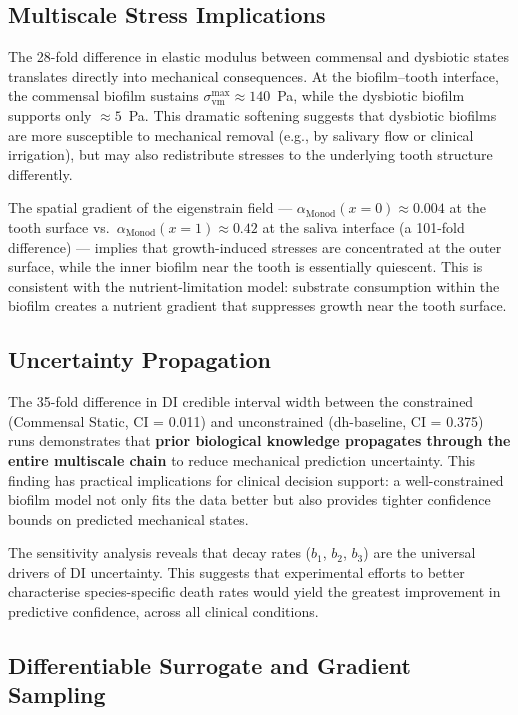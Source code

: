 \documentclass[11pt,a4paper]{article}
\begin{document}
\subsection{Multiscale Stress Implications}

The 28-fold difference in elastic modulus between commensal and dysbiotic states translates directly into mechanical consequences.
At the biofilm--tooth interface, the commensal biofilm sustains $\sigma_\mathrm{vm}^\mathrm{max} \approx 140$~Pa, while the dysbiotic biofilm supports only $\approx 5$~Pa.
This dramatic softening suggests that dysbiotic biofilms are more susceptible to mechanical removal (e.g., by salivary flow or clinical irrigation), but may also redistribute stresses to the underlying tooth structure differently.

The spatial gradient of the eigenstrain field --- $\alpha_\mathrm{Monod}(x=0) \approx 0.004$ at the tooth surface vs.\ $\alpha_\mathrm{Monod}(x=1) \approx 0.42$ at the saliva interface (a 101-fold difference) --- implies that growth-induced stresses are concentrated at the outer surface, while the inner biofilm near the tooth is essentially quiescent.
This is consistent with the nutrient-limitation model: substrate consumption within the biofilm creates a nutrient gradient that suppresses growth near the tooth surface.

\subsection{Uncertainty Propagation}

The 35-fold difference in DI credible interval width between the constrained (Commensal Static, CI = 0.011) and unconstrained (dh-baseline, CI = 0.375) runs demonstrates that \textbf{prior biological knowledge propagates through the entire multiscale chain} to reduce mechanical prediction uncertainty.
This finding has practical implications for clinical decision support: a well-constrained biofilm model not only fits the data better but also provides tighter confidence bounds on predicted mechanical states.

The sensitivity analysis reveals that decay rates ($b_1$, $b_2$, $b_3$) are the universal drivers of DI uncertainty.
This suggests that experimental efforts to better characterise species-specific death rates would yield the greatest improvement in predictive confidence, across all clinical conditions.

\subsection{Differentiable Surrogate and Gradient Sampling}
\end{document}
